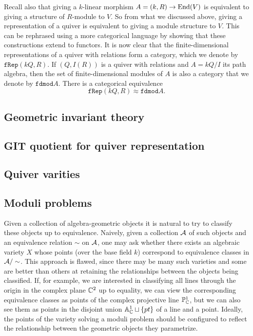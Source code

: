         Recall also that giving a $k$-linear morphism $A=(k,R)\to\text{End}(V)$ is equivalent to giving a structure of $R$-module to $V$. So from what we discussed above, giving a representation of a quiver is equivalent to giving a module structure to $V$. This can be rephrased using a more categorical language by showing that these constructions extend to functors. It is now clear that the finite-dimensional representations of a quiver with relations form a category, which we denote by $\texttt{fRep}(kQ,R)$. If $(Q,I(R))$ is a quiver with relations and $A=kQ/I$ its path algebra, then the set of finite-dimensional modules of $A$ is also a category that we denote by $\texttt{fdmod}A$. There is a categorical equivalence
        \begin{equation}
            \boxed{\texttt{fRep}(kQ,R)\approx\texttt{fdmod}A.}
        \end{equation}

    \subsection{Geometric invariant theory}

    \subsection{GIT quotient for quiver representation}

    \subsection{Quiver varities}

    \subsection{Moduli problems}

        Given a collection of algebra-geometric objects it is natural to try to classify these objects up to equivalence. Naively, given a collection $\mathcal{A}$ of such objects and an equivalence relation $\sim$ on $\mathcal{A}$, one may ask whether there exists an algebraic variety $X$ whose points (over the base field $k$) correspond to equivalence classes in $\mathcal{A}/\sim$. This approach is flawed, since there may be many such varieties and some are better than others at retaining the relationships between the objects being classified. If, for example, we are interested in classifying all lines through the origin in the complex plane $\mathbb{C}^2$ up to equality, we can view the corresponding equivalence classes as points of the complex projective line $\mathbb{P}^1_{\mathbb{C}}$, but we can also see them as points in the disjoint union $\mathbb{A}^1_{\mathbb{C}}\sqcup\{pt\}$ of a line and a point. Ideally, the points of the variety solving a moduli problem should be configured to reflect the relationship between the geometric objects they parametrize.
        
